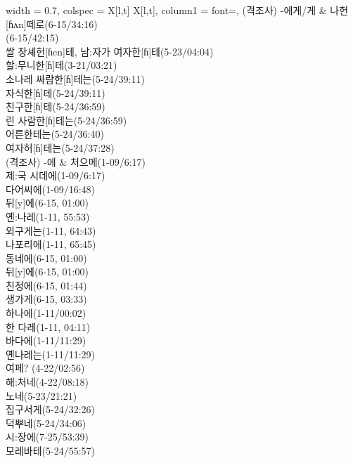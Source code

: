 \begin{longtblr}{
    width = 0.7\textwidth,
    colspec = {X[l,t] X[l,t]},
    column{1} = {font=\sffamily\bfseries},
  }
  (격조사) -에게/게 & {나헌[ɦʌn]떼로(6-15/34:16) \\ (6-15/42:15) \\ 쌀 장셰헌[ɦen]테, 남:자가 여자한[ɦ]테(5-23/04:04) \\ 할:무니한[ɦ]테(3-21/03:21) \\ 소나레 싸람한[ɦ]테는(5-24/39:11) \\ 자식한[ɦ]테(5-24/39:11) \\ 친구한[ɦ]테(5-24/36:59) \\ 린 사람한[ɦ]테는(5-24/36:59) \\ 어른한테는(5-24/36:40) \\ 여자허[ɦ]테는(5-24/37:28)} \\
  (격조사) -에 & {처으메(1-09/6:17) \\ 제:국 시데에(1-09/6:17) \\ 다어씨에(1-09/16:48) \\ 뒤[y]에(6-15,   01:00) \\ 옌:나레(1-11, 55:53) \\ 외구게는(1-11, 64:43) \\ 나포리에(1-11, 65:45) \\ 동네에(6-15,   01:00) \\ 뒤[y]에(6-15, 01:00) \\ 친정에(6-15, 01:44) \\ 생가게(6-15, 03:33) \\ 하나에(1-11/00:02) \\ 한 다레(1-11, 04:11) \\ 바다에(1-11/11:29) \\ 옌나레는(1-11/11:29) \\ 여페?   (4-22/02:56) \\ 해:처네(4-22/08:18) \\ 노네(5-23/21:21) \\ 집구서게(5-24/32:26) \\ 덕뿌네(5-24/34:06) \\ 시:장에(7-25/53:39) \\ 모레바테(5-24/55:57)} \\

\end{longtblr}
